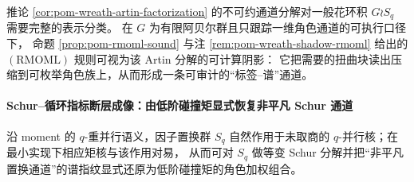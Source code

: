 \begin{remark}\label{rem:pom-wreath-artin-computable-shadow}
推论 \ref{cor:pom-wreath-artin-factorization} 的不可约通道分解对一般花环积 \(G\wr S_q\) 需要完整的表示分类。
在 \(G\) 为有限阿贝尔群且只跟踪一维角色通道的可执行口径下，
命题 \ref{prop:pom-rmoml-sound} 与注 \ref{rem:pom-wreath-shadow-rmoml} 给出的 \((\mathrm{RMOML})\) 规则可视为该 Artin 分解的可计算阴影：
它把需要的扭曲块读出压缩到可枚举角色族上，从而形成一条可审计的“标签--谱”通道。
\end{remark}

\paragraph{Schur--循环指标断层成像：由低阶碰撞矩显式恢复非平凡 Schur 通道}
沿 moment 的 \(q\)-重并行语义，因子置换群 \(S_q\) 自然作用于未取商的 \(q\)-并行核；在最小实现下相应矩核与该作用对易，
从而可对 \(S_q\) 做等变 Schur 分解并把“非平凡置换通道”的谱指纹显式还原为低阶碰撞矩的角色加权组合。


